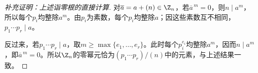 \begin{proof}[补充证明：上述诣零根的直接计算]
对$\overline a=a+(n)\in\Z_n$，若$\overline a^{\,m}=0$，则$n\mid a^m$，所以每个$p_i$均整除$a^m$。由$p_i$为素数，每个$p_i$均整除$a$；因这些素数互不相同，$p_1\cdots p_r\mid a$。

反过来，若$p_1\cdots p_r\mid a$，取$m\ge\max\{e_1,\ldots,e_r\}$。此时每个$p_i^{e_i}$均整除$a^m$，因而$n\mid a^m$，即$\overline a^{\,m}=0$。所以$\Z_n$的零幂元恰为$(p_1\cdots p_r)/(n)$中的元素，与上述结果一致。
\end{proof}

